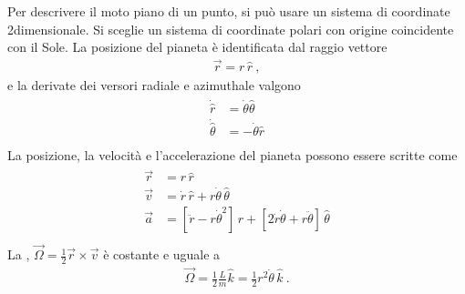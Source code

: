 \documentclass[letterpaper,10pt,italian]{jupyterBook}
\begin{document}
\sphinxAtStartPar
{} Per descrivere il moto piano di un punto, si può usare un sistema di coordinate 2\sphinxhyphen{}dimensionale. Si sceglie un sistema di coordinate polari con origine coincidente con il Sole. La posizione del pianeta è identificata dal raggio vettore
\begin{equation*}
\begin{split}\vec{r} = r \, \hat{r} \ ,\end{split}
\end{equation*}
\sphinxAtStartPar
e la derivate dei versori radiale e azimuthale valgono
\begin{equation*}
\begin{split}\begin{aligned}
\dot{\hat{r}}      & =   \dot{\theta} \hat{\theta} \\
\dot{\hat{\theta}} & = - \dot{\theta} \hat{r} \\
\end{aligned}\end{split}
\end{equation*}
\sphinxAtStartPar
La posizione, la velocità e l’accelerazione del pianeta possono essere scritte come
\begin{equation*}
\begin{split}\begin{aligned}
\vec{r} & = r \, \hat{r} \\
\vec{v} & = \dot{r} \, \hat{r} + r \dot{\theta} \, \hat{\theta} \\
\vec{a} & = \left[ \ddot{r} - r \dot{\theta}^2 \right] \, \hat{r} +  \left[ 2 \dot{r} \dot{\theta} + r \ddot{\theta} \right] \, \hat{\theta}  \\
\end{aligned}\end{split}
\end{equation*}
\sphinxAtStartPar
La , \(\vec{\Omega} = \frac{1}{2} \vec{r} \times \vec{v} \) è costante e uguale a
\begin{equation*}
\begin{split}\vec{\Omega} = \frac{1}{2} \frac{L}{m} \hat{k} = \frac{1}{2} r^2 \dot{\theta} \, \hat{k} \ .\end{split}
\end{equation*}
\end{document}
